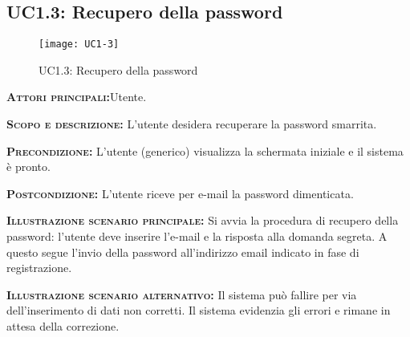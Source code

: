 \subsection{UC1.3: Recupero della password}
\begin{figure}[h!]
\centering
\texttt{[image: UC1-3]}
\caption{UC1.3: Recupero della password}\label{UC1.3}
\end{figure}
\begin{description}
\item{\scshape\bfseries Attori principali:}Utente.
\item{\scshape\bfseries Scopo e descrizione:} L'utente desidera recuperare la password smarrita.
\item{\scshape\bfseries Precondizione:} L'utente (generico) visualizza la schermata iniziale e il sistema è pronto.
\item{\scshape\bfseries Postcondizione:} L'utente riceve per e-mail la password dimenticata.
\item{\scshape\bfseries Illustrazione scenario principale:} Si avvia la procedura di recupero della password: l'utente deve inserire l'e-mail e la risposta alla domanda segreta. A questo segue l'invio della password all'indirizzo email indicato in fase di registrazione.
\item{\scshape\bfseries Illustrazione scenario alternativo:} Il sistema può fallire per via dell'inserimento di dati non corretti. Il sistema evidenzia gli errori e rimane in attesa della correzione.
\end{description}

